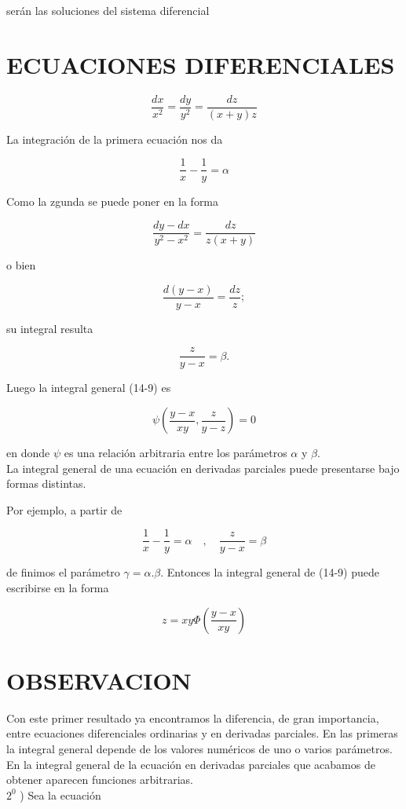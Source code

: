 \documentclass[10pt]{article}
\theoremstyle{plain}
\theoremstyle{definition}
\theoremstyle{remark}
\begin{document}
serán las soluciones del sistema diferencial

\section*{ECUACIONES DIFERENCIALES}
$$
\frac{d x}{x^{2}}=\frac{d y}{y^{2}}=\frac{d z}{(x+y) z}
$$

La integración de la primera ecuación nos da

$$
\frac{1}{x}-\frac{1}{y}=\alpha
$$

Como la zgunda se puede poner en la forma

$$
\frac{d y-d x}{y^{2}-x^{2}}=\frac{d z}{z(x+y)}
$$

o bien

$$
\frac{d(y-x)}{y-x}=\frac{d z}{z} ;
$$

su integral resulta

$$
\frac{z}{y-x}=\beta .
$$

Luego la integral general (14-9) es


\begin{equation*}
\psi\left(\frac{y-x}{x y}, \frac{z}{y-z}\right)=0 \tag{14-10}
\end{equation*}


en donde $\psi$ es una relación arbitraria entre los parámetros $\alpha$ y $\beta$.\\
La integral general de una ecuación en derivadas parciales puede presentarse bajo formas distintas.

Por ejemplo, a partir de


$$
\frac{1}{x}-\frac{1}{y}=\alpha \quad, \quad \frac{z}{y-x}=\beta
$$

de finimos el parámetro $\gamma=\alpha . \beta$. Entonces la integral general de (14-9) puede escribirse en la forma

$$
z=x y \Phi\left(\frac{y-x}{x y}\right)
$$

\section*{OBSERVACION}
Con este primer resultado ya encontramos la diferencia, de gran importancia, entre ecuaciones diferenciales ordinarias y en derivadas parciales. En las primeras la integral general depende de los valores numéricos de uno o varios parámetros. En la integral general de la ecuación en derivadas parciales que acabamos de obtener aparecen funciones arbitrarias.\\
$2^{0}$ ) Sea la ecuación
\end{document}
